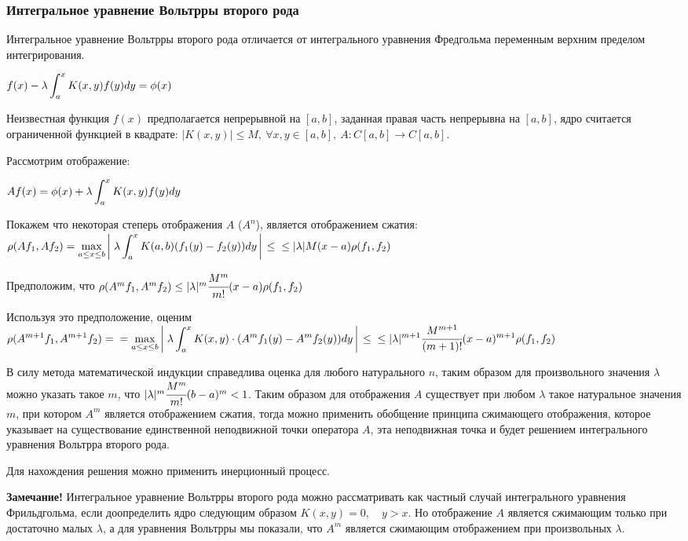 \documentclass[12pt]{report}
\renewcommand{\[}{$\\\displaystyle}
\renewcommand{\]}{\\$}
\renewcommand{\[}{$\\\displaystyle}
\newcommand{\sep}{,\ }
\newcommand{\bb}[1][]{\left#1\vphantom{\int_1^2}\right.}
\begin{document}
\subsubsection{Интегральное уравнение Вольтрры второго рода}

Интегральное уравнение Вольтрры второго рода отличается от интегрального уравнения Фредгольма переменным верхним пределом интегрирования.

\[ f(x)-\lambda \int_a^xK(x,y)f(y)dy=\phi(x)\]

Неизвестная функция $f(x)$ предполагается непрерывной на $[a,b]$, заданная правая часть непрерывна на $[a,b]$, ядро считается ограниченной функцией в квадрате: $|K(x,y)|\leq M\sep\forall x,y\in[a,b]\sep A:C[a,b]\rightarrow C[a,b]$.

Рассмотрим отображение:

\[ Af(x)=\phi(x)+\lambda\int_a^xK(x,y)f(y)dy \]

Покажем что некоторая степерь отображения $A$ ($A^n$), является отображением сжатия:
\[\rho(Af_1,Af_2)=\max_{a\leq x\leq b}\bb[|]\lambda\int_a^xK(a,b)(f_1(y)-f_2(y))dy\bb[|]\leq\\
\leq |\lambda|M(x-a)\rho(f_1,f_2)
\]

Предположим, что $\rho(A^mf_1,A^mf_2)\leq |\lambda|^m\cfrac{M^m}{m!}(x-a)\rho(f_1,f_2)$

Используя это предположение, оценим
\[
\rho(A^{m+1}f_1,A^{m+1}f_2)=\\
=\max_{a\leq x\leq b}\bb[|]\lambda\int_a^xK(x,y)\cdot(A^mf_1(y)-A^mf_2(y))dy\bb[|]\leq\\
\leq|\lambda|^{m+1}\cfrac{M^{m+1}}{(m+1)!}(x-a)^{m+1}\rho(f_1,f_2)
\]

В силу метода математической индукции справедлива оценка для любого натурального $n$, таким образом для произвольного значения $\lambda$ можно указать такое $m$, что $|\lambda|^m\cfrac{M^m}{m!}(b-a)^m<1$. Таким образом для отображения $A$ существует при любом $\lambda$ такое натуральное значения $m$, при котором $A^m$ является отображением сжатия, тогда можно применить обобщение принципа сжимающего отображения, которое  указывает на существование единственной неподвижной точки оператора $A$, эта неподвижная точка и будет решением интегрального уравнения Вольтрра второго рода.

Для нахождения решения можно применить инерционный процесс.

\textbf{Замечание!} Интегральное уравнение Вольтрры второго рода можно рассматривать как частный случай интегрального уравнения Фрильдгольма, если доопределить ядро следующим образом $K(x,y)=0,\quad y>x$. Но отображение $A$ является сжимающим только при достаточно малых $\lambda$, а для уравнения Вольтрры мы показали, что $A^m$ является сжимающим отображением при произвольных $\lambda$.
\end{document}
